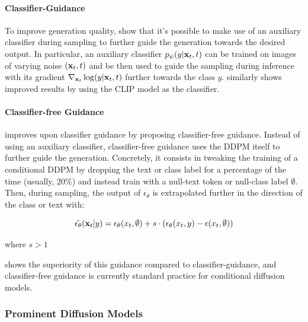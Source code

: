 \paragraph{Classifier-Guidance}
To improve generation quality, \cite{sohl2015deep, song2020score, dhariwal2021diffusion} show that 
it's possible to make use of an auxiliary classifier
during sampling to further guide the generation towards the desired output. 
In particular, an auxiliary classifier $p_\psi(y|\mathbf{x}_t, t)$ can be trained on images of varying noise 
$(\mathbf{x}_t, t)$ 
and be then used to guide the sampling during inference with its gradient 
 $\nabla_{\mathbf{x}_t} \log(y|\mathbf{x}_t, t) $ further towards the class $y$. 
 \cite{nichol2021glide} similarly shows improved results by using the CLIP \citep{radford2021learning}
 model as the classifier.

\paragraph{Classifier-free Guidance}
\cite{ho2022classifierfree} improves upon classifier guidance by 
proposing classifier-free guidance. Instead of using an auxiliary classifier, 
classifier-free guidance uses the \ac{DDPM} itself to further guide the 
generation. Concretely, it consists in tweaking the training of a conditional \ac{DDPM} 
by dropping the text or class label for a percentage of the time (usually, $20\%$)
and instead train with a null-text token or null-class label $\emptyset$. Then, during 
sampling, the output of $\epsilon_\theta$ is extrapolated further in the direction 
of the class or text with:

\begin{equation}
      \hat{\epsilon_\theta}(\mathbf{x}_t|y) = \epsilon_\theta(x_t, \emptyset) + s \cdot (\epsilon_\theta(x_t, y) - \epsilon(x_t, \emptyset))
\end{equation}

\noindent where $s > 1$

\cite{nichol2021glide} shows the superiority of this guidance compared to classifier-guidance,
and classifier-free guidance is currently standard practice for conditional diffusion models.

\subsubsection{Prominent Diffusion Models}


